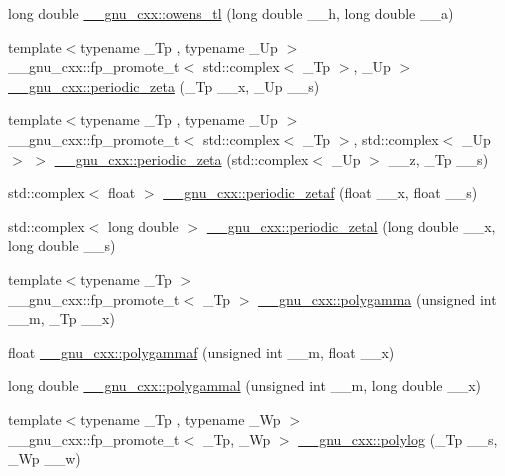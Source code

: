 \begin{DoxyCompactItemize}
\item 
long double \hyperlink{group__gnu__math__spec__func_ga7a8bc60dc0ef4a009586872eb7cac2d0}{\+\_\+\+\_\+gnu\+\_\+cxx\+::owens\+\_\+tl} (long double \+\_\+\+\_\+h, long double \+\_\+\+\_\+a)
\item 
{\footnotesize template$<$typename \+\_\+\+Tp , typename \+\_\+\+Up $>$ }\\\+\_\+\+\_\+gnu\+\_\+cxx\+::fp\+\_\+promote\+\_\+t$<$ std\+::complex$<$ \+\_\+\+Tp $>$, \+\_\+\+Up $>$ \hyperlink{group__gnu__math__spec__func_ga06b06216e87b868cb21c76d33ac560c8}{\+\_\+\+\_\+gnu\+\_\+cxx\+::periodic\+\_\+zeta} (\+\_\+\+Tp \+\_\+\+\_\+x, \+\_\+\+Up \+\_\+\+\_\+s)
\item 
{\footnotesize template$<$typename \+\_\+\+Tp , typename \+\_\+\+Up $>$ }\\\+\_\+\+\_\+gnu\+\_\+cxx\+::fp\+\_\+promote\+\_\+t$<$ std\+::complex$<$ \+\_\+\+Tp $>$, std\+::complex$<$ \+\_\+\+Up $>$ $>$ \hyperlink{group__gnu__math__spec__func_gaf3704ce510319b5c4c5cedd55dfaa42f}{\+\_\+\+\_\+gnu\+\_\+cxx\+::periodic\+\_\+zeta} (std\+::complex$<$ \+\_\+\+Up $>$ \+\_\+\+\_\+z, \+\_\+\+Tp \+\_\+\+\_\+s)
\item 
std\+::complex$<$ float $>$ \hyperlink{group__gnu__math__spec__func_ga1308c2a5d1b263757485cb48eb2c19ff}{\+\_\+\+\_\+gnu\+\_\+cxx\+::periodic\+\_\+zetaf} (float \+\_\+\+\_\+x, float \+\_\+\+\_\+s)
\item 
std\+::complex$<$ long double $>$ \hyperlink{group__gnu__math__spec__func_gab7573fb57ebaabac4432bb5e6b525151}{\+\_\+\+\_\+gnu\+\_\+cxx\+::periodic\+\_\+zetal} (long double \+\_\+\+\_\+x, long double \+\_\+\+\_\+s)
\item 
{\footnotesize template$<$typename \+\_\+\+Tp $>$ }\\\+\_\+\+\_\+gnu\+\_\+cxx\+::fp\+\_\+promote\+\_\+t$<$ \+\_\+\+Tp $>$ \hyperlink{group__gnu__math__spec__func_ga65e674e7fe1457e819897e0d608c18b8}{\+\_\+\+\_\+gnu\+\_\+cxx\+::polygamma} (unsigned int \+\_\+\+\_\+m, \+\_\+\+Tp \+\_\+\+\_\+x)
\item 
float \hyperlink{group__gnu__math__spec__func_ga91861fadef76d4f73afacffcac66e312}{\+\_\+\+\_\+gnu\+\_\+cxx\+::polygammaf} (unsigned int \+\_\+\+\_\+m, float \+\_\+\+\_\+x)
\item 
long double \hyperlink{group__gnu__math__spec__func_gaa6a37359a97ba43f32aa842705c416d4}{\+\_\+\+\_\+gnu\+\_\+cxx\+::polygammal} (unsigned int \+\_\+\+\_\+m, long double \+\_\+\+\_\+x)
\item 
{\footnotesize template$<$typename \+\_\+\+Tp , typename \+\_\+\+Wp $>$ }\\\+\_\+\+\_\+gnu\+\_\+cxx\+::fp\+\_\+promote\+\_\+t$<$ \+\_\+\+Tp, \+\_\+\+Wp $>$ \hyperlink{group__gnu__math__spec__func_gabcc5480ad739561c2debd6a8a352084f}{\+\_\+\+\_\+gnu\+\_\+cxx\+::polylog} (\+\_\+\+Tp \+\_\+\+\_\+s, \+\_\+\+Wp \+\_\+\+\_\+w)

\end{DoxyCompactItemize}
